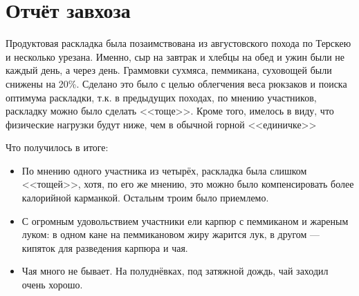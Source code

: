 \section{Отчёт завхоза}

Продуктовая раскладка была позаимствована из августовского похода по Терскею \cite{teskei2025ostapiv} и несколько урезана. Именно, сыр на завтрак и хлебцы на обед и ужин были не каждый день, а через день. Граммовки сухмяса, пеммикана, суховощей были снижены на 20\%. Сделано это было с целью облегчения веса рюкзаков и поиска оптимума раскладки, т.к. в предыдущих походах, по мнению участников, раскладку можно было сделать <<тоще>>. Кроме того, имелось в виду, что физические нагрузки будут ниже, чем в обычной горной <<единичке>>

Что получилось в итоге:
\begin{itemize}
    \item По мнению одного участника из четырёх, раскладка была слишком <<тощей>>, хотя, по его же мнению, это можно было компенсировать более калорийной карманкой. Остальнм троим было приемлемо.
    \item С огромным удовольствием участники ели карпюр с пеммиканом и жареным луком: в одном кане на пеммикановом жиру жарится лук, в другом — 
	кипяток для разведения карпюра и чая.
	\item Чая много не бывает. На полуднёвках, под затяжной дождь, чай заходил очень хорошо.
    
\end{itemize}



